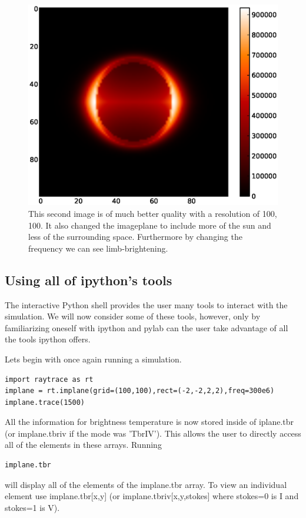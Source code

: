 \documentclass[12pt]{article}
\begin{document}
\begin{figure}[ht]
\begin{center}
\includegraphics[scale=.75]{second_tbr}
\end{center}
\caption{This second image is of much better quality with a resolution
of 100, 100. It also changed the imageplane to include more of the sun
and less of the surrounding space. Furthermore by changing the
frequency we can see limb-brightening.}
\end{figure}

\subsection{Using all of ipython's tools}
The interactive Python shell provides the user many tools to interact with the
simulation. We will now consider some of these tools, however, only by
familiarizing oneself with ipython and pylab can the user take
advantage of all the tools ipython offers.

Lets begin with once again running a simulation.

\begin{lstlisting}
import raytrace as rt
implane = rt.implane(grid=(100,100),rect=(-2,-2,2,2),freq=300e6)
implane.trace(1500)
\end{lstlisting}
All the information for brightness temperature is now stored inside of 
iplane.tbr (or implane.tbriv if the mode was 'TbrIV'). This allows the 
user to directly access all of the elements in these arrays. Running
\begin{lstlisting}
implane.tbr
\end{lstlisting}
will display all of the elements of the implane.tbr array. To view an
individual element use implane.tbr[x,y] (or implane.tbriv[x,y,stokes]
where stokes=0 is I and stokes=1 is V).
\end{document}
